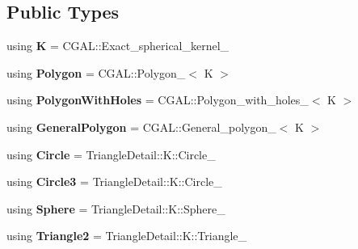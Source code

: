 \subsection*{Public Types}
\begin{DoxyCompactItemize}
\item 
\mbox{\label{classpepr3d_1_1_triangle_detail_ac8aeea781673db9a1310d3754ae88162}} 
using {\bfseries K} = C\+G\+A\+L\+::\+Exact\+\_\+spherical\+\_\+kernel\+\_
\item 
\mbox{\label{classpepr3d_1_1_triangle_detail_a5859c7791d50841feed809f364e9d7db}} 
using {\bfseries Polygon} = C\+G\+A\+L\+::\+Polygon\+\_$<$ K $>$
\item 
\mbox{\label{classpepr3d_1_1_triangle_detail_a039d2236b4e8aad6a2e38561632de058}} 
using {\bfseries Polygon\+With\+Holes} = C\+G\+A\+L\+::\+Polygon\+\_\+with\+\_\+holes\+\_$<$ K $>$
\item 
\mbox{\label{classpepr3d_1_1_triangle_detail_ab3714e9fe2715a106d89ef9db6fe1773}} 
using {\bfseries General\+Polygon} = C\+G\+A\+L\+::\+General\+\_\+polygon\+\_$<$ K $>$
\item 
\mbox{\label{classpepr3d_1_1_triangle_detail_a6db5a16950df85449f31b2942a594ee4}} 
using {\bfseries Circle} = Triangle\+Detail\+::\+K\+::\+Circle\+\_
\item 
\mbox{\label{classpepr3d_1_1_triangle_detail_a219a64553d6903e53c2a0e554c085be3}} 
using {\bfseries Circle3} = Triangle\+Detail\+::\+K\+::\+Circle\+\_
\item 
\mbox{\label{classpepr3d_1_1_triangle_detail_aa5ad5f3d5e27f70a1f5308103fb49fae}} 
using {\bfseries Sphere} = Triangle\+Detail\+::\+K\+::\+Sphere\+\_
\item 
\mbox{\label{classpepr3d_1_1_triangle_detail_a433097027b9cb64c5cc1773ea3362b24}} 
using {\bfseries Triangle2} = Triangle\+Detail\+::\+K\+::\+Triangle\+\_
\item 
\mbox{\label{classpepr3d_1_1_triangle_detail_add21fa0f5067429e5214ad6b71dfe0cc}} 

\end{DoxyCompactItemize}
